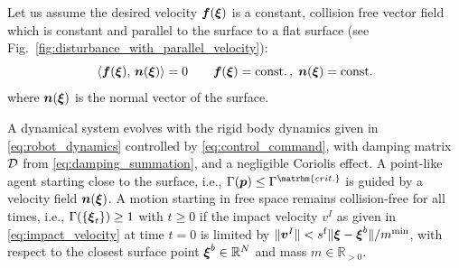 
Let us assume the desired velocity $\boldsymbol{f}(\boldsymbol{\xi})$ is a constant, collision free vector field which is constant and parallel to the surface to a flat surface (see Fig.~\ref{fig:disturbance_with_parallel_velocity}):
\begin{equation}
	\dotprod{\vect f(\vecs \xi)}{\vecs n(\vecs \xi)} = 0
	 \qquad
\vect f(\vecs \xi) = \text{const.}
\, , \;
\vect n(\vecs \xi) = \text{const.}
\label{eq:parallel_velocity}
\end{equation}
where $\boldsymbol{n}(\boldsymbol{\xi})$ is the normal vector of the surface. 

\begin{lemma}
	A dynamical system evolves with the rigid body dynamics given in \eqref{eq:robot_dynamics} controlled by \eqref{eq:control_command}, with damping matrix $\mathcal{D}$ from \eqref{eq:damping_summation}, and a negligible Coriolis effect.
	A point-like agent starting close to the surface, i.e., $\Gamma( \vect p) \leq \Gamma^{\matrhm{crit.}}$ is guided by a velocity field $\boldsymbol{n}(\boldsymbol{\xi})$.
	A motion starting in free space remains collision-free for all times, i.e., $\Gamma( \{\boldsymbol{\xi}_t\}) \geq 1$ with $t \geq 0$ if the impact velocity $v^I$ as given in \eqref{eq:impact_velocity} at time $t=0$ is limited by $\| \boldsymbol{v}^I\| < s^{\mathrm{f}} \| \boldsymbol{\xi} - \boldsymbol{\xi}^b \| / m^{\mathrm{min}}$, with respect to the closest surface point $\boldsymbol{\xi}^b \in \mathbb{R}^N$ and mass $m \in \mathbb{R}_{>0}$.
\end{lemma}

